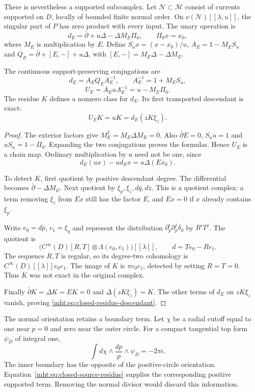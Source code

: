 There is nevertheless a supported subcomplex. Let
$\mathscr N\subset\mathscr M$ consist of currents supported
on $D$, locally of bounded finite normal order.
On $\nu(\mathscr N)[[\lambda,u]]$, the singular part of $P$
has zero product with every input. The unary operation is
\[
 d_E=\bar\partial+u\Delta-\Delta M_E\Pi_0,
 \qquad \Pi_0x=x_0,
\]
where $M_E$ is multiplication by $E$.
Define $S_ux=(x-x_0)/u$, $A_E=1-M_ES_u$ and
$Q_E=\bar\partial+[E,-]+u\Delta$, with
$[E,-]=M_E\Delta-\Delta M_E$.

\begin{proposition}\label{mht:prop:supported-closed-residue}
The continuous support-preserving conjugations are
\[
 d_E=A_EQ_EA_E^{-1},\qquad A_E^{-1}=1+M_ES_u,
\]
\[
 U_E=A_EuA_E^{-1}=u-M_E\Pi_0.
\]
The residue $K$ defines a nonzero class for $d_E$.
Its first transported descendant is exact:
\begin{equation}\label{mht:eq:closed-residue-descendant}
 U_EK=uK=d_E(zK\xi_z).
\end{equation}
\end{proposition}
\begin{proof}
The exterior factors give $M_E^2=M_E\Delta M_E=0$.
Also $\bar\partial E=0$, $S_uu=1$ and
$uS_u=1-\Pi_0$. Expanding the two conjugations proves
the formulas. Hence $U_E$ is a chain map. Ordinary
multiplication by $u$ need not be one, since
\[
 d_E(ux)-u d_Ex=u\Delta(Ex_0).
\]

To detect $K$, first quotient by positive descendant degree.
The differential becomes $\bar\partial-\Delta M_E$.
Next quotient by $\xi_p,\xi_z,d\bar q,d\bar z$.
This is a quotient complex: a term removing $\xi_z$
from $Ex$ still has the factor $E$, and $Ex=0$ if
$x$ already contains $\xi_p$.

Write $e_0=d\bar p$, $e_1=\xi_q$ and represent the
distribution $\partial_p^i\partial_{\bar p}^j\delta_0$
by $R^iT^j$. The quotient is
\[
 \bigl(C^\infty(D)[R,T]\otimes\Lambda(e_0,e_1)\bigr)[[\lambda]],
 \qquad d=T e_0-R e_1.
\]
The sequence $R,T$ is regular, so its degree-two cohomology
is $C^\infty(D)[[\lambda]]e_0e_1$. The image of $K$ is
$\pi e_0e_1$, detected by setting $R=T=0$.
Thus $K$ was not exact in the original complex.

Finally $\bar\partial K=\Delta K=EK=0$ and
$\Delta(zK\xi_z)=K$. The other terms of $d_E$ on
$zK\xi_z$ vanish, proving \eqref{mht:eq:closed-residue-descendant}.
\end{proof}

The normal orientation retains a boundary term. Let $\chi$
be a radial cutoff equal to one near $p=0$ and zero near
the outer circle. For a compact tangential top form $\psi_D$
of integral one,
\[
 \int d\chi\wedge\frac{dp}{p}\wedge\psi_D=-2\pi i.
\]
The inner boundary has the opposite of the positive-circle
orientation. Equation~\eqref{mht:eq:closed-source-residue}
supplies the corresponding positive supported term.
Removing the normal divisor would discard this information.

